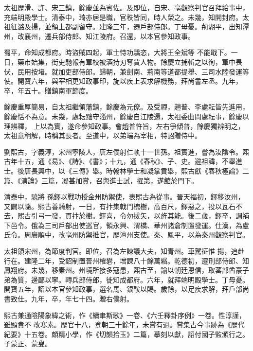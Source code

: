 \begin{pinyinscope}
 太祖歷滑、許、宋三鎮，餘慶並為賓佐。及即位，自宋、亳觀察判官召拜給事中，充端明殿學士。清泰中，琦亦居是職，官秩皆同，時人榮之。未幾，知開封府。太祖征潞及揚，並領上都副留守。建隆三年，遷戶部侍郎。丁母憂。荊湖平，出知潭州，改襄州，遷兵部侍郎、知江陵府。召還，以本官參知政事。



 蜀平，命知成都府。時盜賊四起，軍士恃功驕恣，大將王全斌等
 不能戢下。一日，藥市始集，街吏馳報有軍校被酒持刃奪賈人物。餘慶立捕斬之以徇，軍中畏伏，民用按堵。就加吏部侍郎。歸朝，兼劍南、荊南等道都提舉、三司水陸發運等使。開寶六年，與宰相更知政事印，旋以疾上表求解機務，拜尚書左丞。九年，卒，年五十。贈鎮南軍節度。



 餘慶重厚簡易，自太祖繼領藩鎮，餘慶為元僚。及受禪，趙普、李處耘皆先進用，餘慶恬不為意。未幾，處耘黜守淄州，餘慶自江陵還，太祖委曲問處耘事，餘慶以理辨釋，
 上以為實，遂命參知政事。會趙普忤旨，左右爭傾普，餘慶獨辨明之，太祖意稍解，時稱其長者。至道中，以弟端為宰相，特詔贈侍中。



 劉熙古，字義淳，宋州寧陵人，唐左僕射仁軌十一世孫。祖實進，嘗為汝陰令。熙古年十五，通《易》、《詩》、《書》；十九，通《春秋》、子、史。避祖諱，不舉進士。後唐長興中，以《三傳》舉。時翰林學士和凝掌貢舉，熙古獻《春秋極論》二篇、《演論》三篇，凝甚加賞，召與進士試，擢第，遂館於門下。



 清泰中，驍將
 孫鐸以戰功授金州防禦使，表熙古為從事。晉天福初，鐸移汝州，又闢以隨。熙古善騎射，一日，有抃集戟門槐樹，高百尺，鐸惡之，投以瓦石不去，熙古引弓一發，貫抃於樹。鐸喜，令勿拔矢，以旌其能。後二歲，鐸卒，調補下邑令。俄為三司戶部出使巡官，領永興、渭橋、華州諸倉制置發運。仕漢，為盧氏令。周廣順中，改亳州防禦推官，歷澶州支使。秦、鳳平，以為秦州觀察判官。



 太祖領宋州，為節度判官。即位，召為左諫議大夫，知青州。車駕征惟
 揚，追赴行在。建隆二年，受詔制置晉州榷礬，增課八十餘萬緡。乾德初，遷刑部侍郎、知鳳翔府。未幾，移秦州。州境所接多寇患，熙古至，諭以朝廷恩信，取蕃部酋豪子弟為質，邊鄙以寧。轉兵部侍郎，徙知成都府。六年，就拜端明殿學士。丁母憂。開寶五年，詔以本官參知政事，選名馬、銀鞍以賜。歲餘，以足疾求解，拜戶部尚書致仕。九年，卒，年七十四。贈右僕射。



 熙古兼通陰陽象緯之術，作《續聿斯歌》一卷、《六壬釋卦序例》一卷。性淳謹，雖顯貴不
 改寒素。歷官十八，登朝三十餘年，未嘗有過。嘗集古今事跡為《歷代紀要》十五卷。頗精小學，作《切韻拾玉》二篇，摹刻以獻，詔付國子監頒行之。子蒙正、蒙叟。




\end{pinyinscope}
